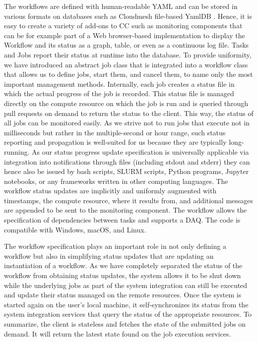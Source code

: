 \documentclass[utf8]{FrontiersinVancouver} %
\begin{document}
The workflows are defined with human-readable YAML and can be stored in various formats on databases such as Cloudmesh file-based YamlDB \citep{yamldb}. Hence, it is easy to create a variety of add-ons to CC such as monitoring components that can be for example part of a Web browser-based implementation to display the Workflow and its status as a graph, table, or even as a continuous log file.  Tasks and Jobs report their status at runtime into the database.  To provide uniformity,  we have introduced an abstract job class that is integrated into a workflow class that allows us to define jobs, start them, and cancel them, to name only the most important management methods. Internally, each job creates a status file in which the actual progress of the job is recorded.  This status file is managed directly on the compute resource on which the job is run and is queried through pull requests on demand to return the status to the client. This way, the status of all jobs can be monitored easily. As we strive not to run jobs that execute not in milliseconds but rather in the multiple-second or hour range, such status reporting and propagation is well-suited for us because they are typically long-running.  As our status progress update specification is universally applicable via integration into notifications through files (including stdout and stderr) they can hence also be issued by bash scripts, SLURM scripts, Python programs, Jupyter notebooks, or any frameworks written in other computing languages. The workflow status updates are implicitly and uniformly augmented with timestamps, the compute resource, where it results from, and additional messages are appended to be sent to the monitoring component.  The workflow allows the specification of dependencies between tasks and supports a DAQ.
The code is compatible with Windows, macOS, and Linux.


The workflow specification plays an important role in not only defining a workflow but also in simplifying status updates that are updating an instantiation of a workflow. As we have completely separated the status of the workflow from obtaining status updates, the system allows it to be shut down while the underlying jobs as part of the system integration can still be executed and update their status managed on the remote resources. Once the system is started again on the user's local machine, it self-synchronizes its status from the system integration services that query the status of the appropriate resources. To summarize, the client is stateless and fetches the state of the submitted jobs on demand. It will return the latest state found on the job execution services.
\end{document}
